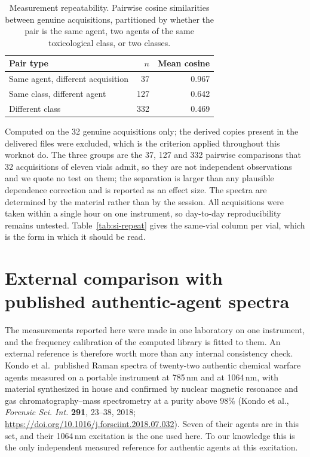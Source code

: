 \documentclass[11pt]{article}
\begin{document}
\begin{table}[htbp]
\centering
\caption{Measurement repeatability. Pairwise cosine similarities between genuine acquisitions, partitioned by whether the pair is the same agent, two agents of the same toxicological class, or two classes.}
\label{tab:si-sessionsim}
\small
\begin{tabular}{lrr}
\toprule
Pair type & $n$ & Mean cosine \\
\midrule
Same agent, different acquisition & 37 & 0.967 \\
Same class, different agent & 127 & 0.642 \\
Different class & 332 & 0.469 \\
\bottomrule
\end{tabular}

\begin{flushleft}\footnotesize Computed on the 32 genuine acquisitions only; the derived copies present in the delivered files were excluded, which is the criterion applied throughout this worknot do. The three groups are the 37, 127 and 332 pairwise comparisons that 32 acquisitions of eleven vials admit, so they are not independent observations and we quote no test on them; the separation is larger than any plausible dependence correction and is reported as an effect size. The spectra are determined by the material rather than by the session. All acquisitions were taken within a single hour on one instrument, so day-to-day reproducibility remains untested. Table~\ref{tab:si-repeat} gives the same-vial column per vial, which is the form in which it should be read.\end{flushleft}
\end{table}
\clearpage

\section{External comparison with published authentic-agent spectra}
\label{si:kondo}

The measurements reported here were made in one laboratory on one instrument, and the
frequency calibration of the computed library is fitted to them. An external reference is
therefore worth more than any internal consistency check. Kondo et al.\ published Raman
spectra of twenty-two authentic chemical warfare agents measured on a portable instrument
at 785\,nm and at 1064\,nm, with material synthesized in house and confirmed by nuclear
magnetic resonance and gas chromatography--mass spectrometry at a purity above
98\% (Kondo et al., \textit{Forensic Sci. Int.} \textbf{291}, 23--38, 2018;
\url{https://doi.org/10.1016/j.forsciint.2018.07.032}). Seven of their agents are in this set, and their 1064\,nm
excitation is the one used here. To our knowledge this is the only independent measured
reference for authentic agents at this excitation.
\end{document}
